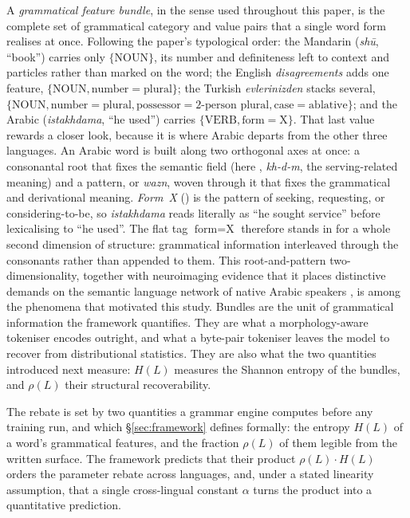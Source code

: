 A \emph{grammatical feature bundle}, in the sense used throughout this paper, is the complete set of grammatical category and value pairs that a single word form realises at once. Following the paper's typological order: the Mandarin  (\emph{sh\=u}, ``book'') carries only $\{\text{NOUN}\}$, its number and definiteness left to context and particles rather than marked on the word; the English \emph{disagreements} adds one feature, $\{\text{NOUN}, \text{number}=\text{plural}\}$; the Turkish \emph{evlerinizden} stacks several, $\{\text{NOUN}, \text{number}=\text{plural}, \text{possessor}=\text{2-person plural}, \text{case}=\text{ablative}\}$; and the Arabic  (\emph{istakhdama}, ``he used'') carries $\{\text{VERB}, \text{form}=\text{X}\}$. That last value rewards a closer look, because it is where Arabic departs from the other three languages. An Arabic word is built along two orthogonal axes at once: a consonantal root that fixes the semantic field (here , \emph{kh-d-m}, the serving-related meaning) and a pattern, or \emph{wazn}, woven through it that fixes the grammatical and derivational meaning. \emph{Form~X} () is the pattern of seeking, requesting, or considering-to-be, so \emph{istakhdama} reads literally as ``he sought service'' before lexicalising to ``he used''. The flat tag $\text{form}=\text{X}$ therefore stands in for a whole second dimension of structure: grammatical information interleaved through the consonants rather than appended to them. This root-and-pattern two-dimensionality, together with neuroimaging evidence that it places distinctive demands on the semantic language network of native Arabic speakers \citep{wei2023native}, is among the phenomena that motivated this study. Bundles are the unit of grammatical information the framework quantifies. They are what a morphology-aware tokeniser encodes outright, and what a byte-pair tokeniser leaves the model to recover from distributional statistics. They are also what the two quantities introduced next measure: $H(L)$ measures the Shannon entropy of the bundles, and $\rho(L)$ their structural recoverability.

The rebate is set by two quantities a grammar engine computes before any training run, and which \S\ref{sec:framework} defines formally: the entropy $H(L)$ of a word's grammatical features, and the fraction $\rho(L)$ of them legible from the written surface. The framework predicts that their product $\rho(L) \cdot H(L)$ orders the parameter rebate across languages, and, under a stated linearity assumption, that a single cross-lingual constant $\alpha$ turns the product into a quantitative prediction.


